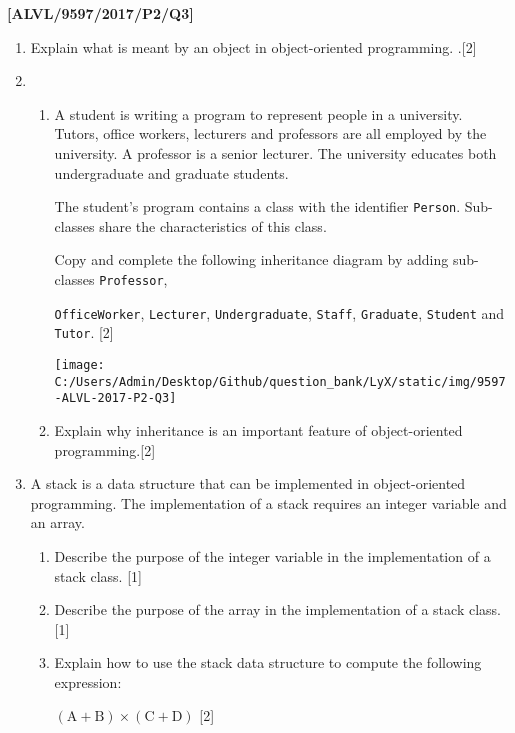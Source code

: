 \item \textbf{{[}ALVL/9597/2017/P2/Q3{]} }
\begin{enumerate}
\item Explain what is meant by an object in object-oriented programming.
.\hfill{}{[}2{]} 
\item {} 
\begin{enumerate}
\item A student is writing a program to represent people in a university.
Tutors, office workers, lecturers and professors are all employed
by the university. A professor is a senior lecturer. The university
educates both undergraduate and graduate students. 

The student\textquoteright s program contains a class with the identifier
\texttt{Person}. Sub-classes share the characteristics of this class. 

Copy and complete the following inheritance diagram by adding sub-classes
\texttt{Professor}, 

\texttt{OfficeWorker}, \texttt{Lecturer}, \texttt{Undergraduate},
\texttt{Staff}, \texttt{Graduate}, \texttt{Student} and \texttt{Tutor}.
\hfill{}{[}2{]} 
\begin{center}
\texttt{[image: C:/Users/Admin/Desktop/Github/question\_bank/LyX/static/img/9597-ALVL-2017-P2-Q3]}
\par\end{center}
\item Explain why inheritance is an important feature of object-oriented
programming.\hfill{}{[}2{]} 
\end{enumerate}
\item A stack is a data structure that can be implemented in object-oriented
programming. The implementation of a stack requires an integer variable
and an array. 
\begin{enumerate}
\item Describe the purpose of the integer variable in the implementation
of a stack class.\hfill{} {[}1{]}
\item Describe the purpose of the array in the implementation of a stack
class.\hfill{} {[}1{]}
\item Explain how to use the stack data structure to compute the following
expression: 
\noindent \begin{center}
$\left(\text{A}+\text{B}\right)\times\left(\text{C}+\text{D}\right)$\hfill{}
{[}2{]}
\par\end{center}

\end{enumerate}
\end{enumerate}
